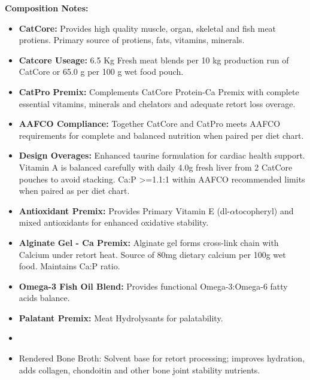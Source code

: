 \noindent\textbf{Composition Notes:}
\begin{itemize}
\item\textbf {CatCore: }Provides high quality muscle, organ, skeletal and fish meat protiens. Primary source of protiens, fats, vitamins, minerals. 
\item \textbf{Catcore Useage: }6.5 Kg Fresh meat blends per 10 kg production run of CatCore or 65.0 g per 100 g wet food pouch.
\item \textbf{CatPro Premix: } Complements CatCore Protein-Ca Premix with complete essential vitamins, minerals and chelators and adequate retort loss overage. 
\item\textbf{AAFCO Compliance: } Together CatCore and CatPro meets AAFCO requirements for complete and balanced nutrition when paired per diet chart. 
\item\textbf{Design Overages: }Enhanced taurine formulation for cardiac health support. Vitamin A is balanced carefully with daily 4.0g fresh liver from 2 CatCore pouches to avoid stacking. Ca:P >=1.1:1 within AAFCO recommended limits when paired  as per diet chart. 
\item \textbf{Antioxidant Premix: } Provides Primary Vitamin E (dl-$\alpha$tocopheryl) and mixed antioxidants for enhanced oxidative stability.
\item \textbf{Alginate Gel - Ca Premix:} Alginate gel forms cross-link chain with Calcium under retort heat. Source of 80mg dietary calcium per 100g wet food. Maintains Ca:P ratio. 
\item \textbf{Omega-3 Fish Oil Blend:} Provides functional Omega-3:Omega-6 fatty acids balance. 
\item \textbf{Palatant Premix: } Meat Hydrolysants for palatability.
\item\item{Rendered Bone Broth: } Solvent base for retort processing; improves hydration, adds collagen, chondoitin and other bone joint stability nutrients. 
\end{itemize}



